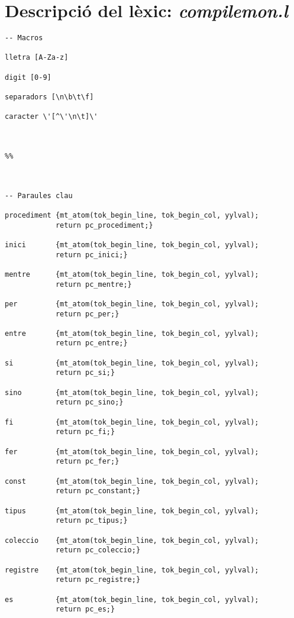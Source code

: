 \documentclass[10pt]{report}
\begin{document}
    \section{Descripció del lèxic: \textit{compilemon.l}}
    \begin{lstlisting}
-- Macros

lletra [A-Za-z]

digit [0-9]

separadors [\n\b\t\f]

caracter \'[^\'\n\t]\'



%%



-- Paraules clau

procediment {mt_atom(tok_begin_line, tok_begin_col, yylval); 
            return pc_procediment;} 

inici       {mt_atom(tok_begin_line, tok_begin_col, yylval); 
            return pc_inici;}

mentre      {mt_atom(tok_begin_line, tok_begin_col, yylval); 
            return pc_mentre;}

per         {mt_atom(tok_begin_line, tok_begin_col, yylval); 
            return pc_per;}

entre       {mt_atom(tok_begin_line, tok_begin_col, yylval); 
            return pc_entre;}

si          {mt_atom(tok_begin_line, tok_begin_col, yylval); 
            return pc_si;}

sino        {mt_atom(tok_begin_line, tok_begin_col, yylval); 
            return pc_sino;}

fi          {mt_atom(tok_begin_line, tok_begin_col, yylval); 
            return pc_fi;}

fer         {mt_atom(tok_begin_line, tok_begin_col, yylval); 
            return pc_fer;}

const       {mt_atom(tok_begin_line, tok_begin_col, yylval); 
            return pc_constant;}

tipus       {mt_atom(tok_begin_line, tok_begin_col, yylval); 
            return pc_tipus;}

coleccio    {mt_atom(tok_begin_line, tok_begin_col, yylval); 
            return pc_coleccio;}

registre    {mt_atom(tok_begin_line, tok_begin_col, yylval); 
            return pc_registre;}

es          {mt_atom(tok_begin_line, tok_begin_col, yylval); 
            return pc_es;}


\end{lstlisting}
\end{document}
